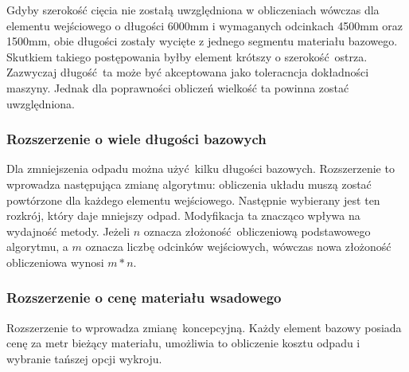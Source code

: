 Gdyby szerokość cięcia nie zostałą uwzględniona w obliczeniach wówczas dla elementu wejściowego o długości 6000mm i wymaganych odcinkach 4500mm oraz 1500mm, obie długości zostały wycięte z jednego segmentu materiału bazowego. Skutkiem takiego postępowania byłby element krótszy o szerokość ostrza. Zazwyczaj długość ta może być akceptowana jako toleracncja dokładności maszyny. Jednak dla poprawności obliczeń wielkość ta powinna zostać uwzględniona.

\subsubsection{Rozszerzenie o wiele długości bazowych}
Dla zmniejszenia odpadu można użyć kilku długości bazowych. Rozszerzenie to wprowadza następująca zmianę algorytmu: obliczenia układu muszą zostać powtórzone dla każdego elementu wejściowego. Następnie wybierany jest ten rozkrój, który daje mniejszy odpad. Modyfikacja ta znacząco wpływa na wydajność metody. Jeżeli $n$ oznacza złożoność obliczeniową podstawowego algorytmu, a $m$ oznacza liczbę odcinków wejściowych, wówczas nowa złożoność obliczeniowa wynosi $m*n$. %

\subsubsection{Rozszerzenie o cenę materiału wsadowego}
Rozszerzenie to wprowadza zmianę koncepcyjną. Każdy element bazowy posiada cenę za metr bieżący materiału, umożliwia to obliczenie kosztu odpadu i wybranie tańszej opcji wykroju.

